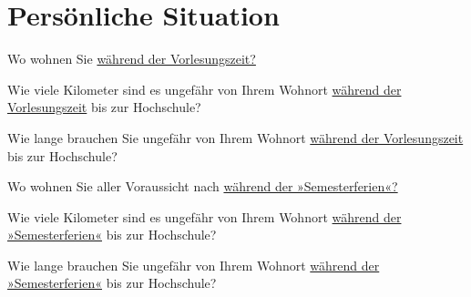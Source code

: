 
\section{Persönliche Situation}
\vspace{.25cm}

\begin{choicequestion}[1]{Wo wohnen Sie \underline{während der Vorlesungszeit?}}
\end{choicequestion}

\separate

\begin{choicequestion}[6]{Wie viele Kilometer sind es ungefähr von Ihrem Wohnort \underline{während der Vorlesungszeit} bis zur Hochschule?}
\end{choicequestion}

\separate

\begin{choicequestion}[6]{Wie lange brauchen Sie ungefähr von Ihrem Wohnort \underline{während der Vorlesungszeit} bis zur Hochschule?}
\end{choicequestion}

\separate

\begin{choicequestion}[1]{Wo wohnen Sie aller Voraussicht nach \underline{während der »Semesterferien«?}}
\end{choicequestion}

\separate

\begin{choicequestion}[6]{Wie viele Kilometer sind es ungefähr von Ihrem Wohnort \underline{während der »Semesterferien«} bis zur Hochschule?}
\end{choicequestion}

\separate

\begin{choicequestion}[6]{Wie lange brauchen Sie ungefähr von Ihrem Wohnort \underline{während der »Semesterferien«} bis zur Hochschule?}
\end{choicequestion}

